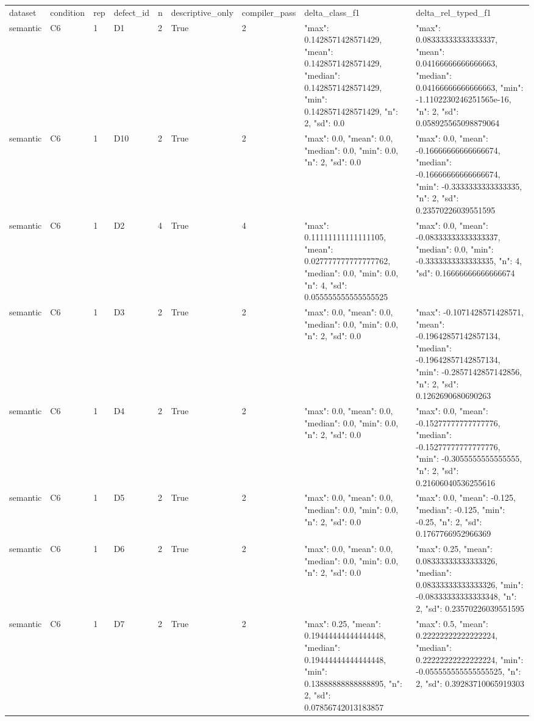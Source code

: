 \begin{tabular}{lllllllll}
dataset & condition & rep & defect\_id & n & descriptive\_only & compiler\_pass & delta\_class\_f1 & delta\_rel\_typed\_f1 \\
semantic & C6 & 1 & D1 & 2 & True & 2 & {"max": 0.1428571428571429, "mean": 0.1428571428571429, "median": 0.1428571428571429, "min": 0.1428571428571429, "n": 2, "sd": 0.0} & {"max": 0.08333333333333337, "mean": 0.04166666666666663, "median": 0.04166666666666663, "min": -1.1102230246251565e-16, "n": 2, "sd": 0.058925565098879064} \\
semantic & C6 & 1 & D10 & 2 & True & 2 & {"max": 0.0, "mean": 0.0, "median": 0.0, "min": 0.0, "n": 2, "sd": 0.0} & {"max": 0.0, "mean": -0.16666666666666674, "median": -0.16666666666666674, "min": -0.3333333333333335, "n": 2, "sd": 0.23570226039551595} \\
semantic & C6 & 1 & D2 & 4 & True & 4 & {"max": 0.11111111111111105, "mean": 0.027777777777777762, "median": 0.0, "min": 0.0, "n": 4, "sd": 0.055555555555555525} & {"max": 0.0, "mean": -0.08333333333333337, "median": 0.0, "min": -0.3333333333333335, "n": 4, "sd": 0.16666666666666674} \\
semantic & C6 & 1 & D3 & 2 & True & 2 & {"max": 0.0, "mean": 0.0, "median": 0.0, "min": 0.0, "n": 2, "sd": 0.0} & {"max": -0.1071428571428571, "mean": -0.19642857142857134, "median": -0.19642857142857134, "min": -0.2857142857142856, "n": 2, "sd": 0.1262690680690263} \\
semantic & C6 & 1 & D4 & 2 & True & 2 & {"max": 0.0, "mean": 0.0, "median": 0.0, "min": 0.0, "n": 2, "sd": 0.0} & {"max": 0.0, "mean": -0.15277777777777776, "median": -0.15277777777777776, "min": -0.3055555555555555, "n": 2, "sd": 0.21606040536255616} \\
semantic & C6 & 1 & D5 & 2 & True & 2 & {"max": 0.0, "mean": 0.0, "median": 0.0, "min": 0.0, "n": 2, "sd": 0.0} & {"max": 0.0, "mean": -0.125, "median": -0.125, "min": -0.25, "n": 2, "sd": 0.1767766952966369} \\
semantic & C6 & 1 & D6 & 2 & True & 2 & {"max": 0.0, "mean": 0.0, "median": 0.0, "min": 0.0, "n": 2, "sd": 0.0} & {"max": 0.25, "mean": 0.08333333333333326, "median": 0.08333333333333326, "min": -0.08333333333333348, "n": 2, "sd": 0.23570226039551595} \\
semantic & C6 & 1 & D7 & 2 & True & 2 & {"max": 0.25, "mean": 0.19444444444444448, "median": 0.19444444444444448, "min": 0.13888888888888895, "n": 2, "sd": 0.07856742013183857} & {"max": 0.5, "mean": 0.22222222222222224, "median": 0.22222222222222224, "min": -0.055555555555555525, "n": 2, "sd": 0.39283710065919303} \\

\end{tabular}
